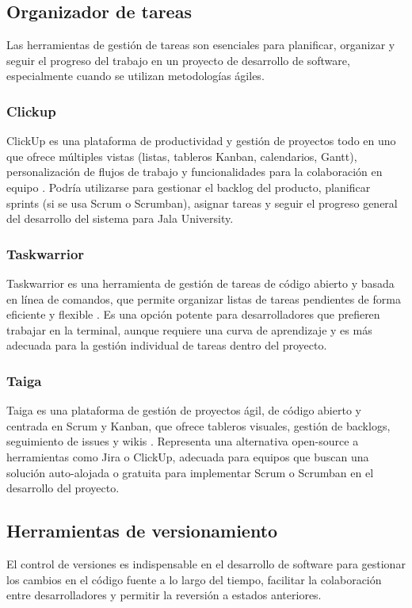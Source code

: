 \subsection{Organizador de tareas}
Las herramientas de gestión de tareas son esenciales para planificar, organizar y seguir el progreso del trabajo en un proyecto de desarrollo de software, especialmente cuando se utilizan metodologías ágiles.

\subsubsection{Clickup}
ClickUp es una plataforma de productividad y gestión de proyectos todo en uno que ofrece múltiples vistas (listas, tableros Kanban, calendarios, Gantt), personalización de flujos de trabajo y funcionalidades para la colaboración en equipo \parencite{ClickUp}. Podría utilizarse para gestionar el backlog del producto, planificar sprints (si se usa Scrum o Scrumban), asignar tareas y seguir el progreso general del desarrollo del sistema para Jala University.

\subsubsection{Taskwarrior}
Taskwarrior es una herramienta de gestión de tareas de código abierto y basada en línea de comandos, que permite organizar listas de tareas pendientes de forma eficiente y flexible \parencite{Taskwarrior}. Es una opción potente para desarrolladores que prefieren trabajar en la terminal, aunque requiere una curva de aprendizaje y es más adecuada para la gestión individual de tareas dentro del proyecto.

\subsubsection{Taiga}
Taiga es una plataforma de gestión de proyectos ágil, de código abierto y centrada en Scrum y Kanban, que ofrece tableros visuales, gestión de backlogs, seguimiento de issues y wikis \parencite{Taiga}. Representa una alternativa open-source a herramientas como Jira o ClickUp, adecuada para equipos que buscan una solución auto-alojada o gratuita para implementar Scrum o Scrumban en el desarrollo del proyecto.

\subsection{Herramientas de versionamiento}
El control de versiones es indispensable en el desarrollo de software para gestionar los cambios en el código fuente a lo largo del tiempo, facilitar la colaboración entre desarrolladores y permitir la reversión a estados anteriores.

